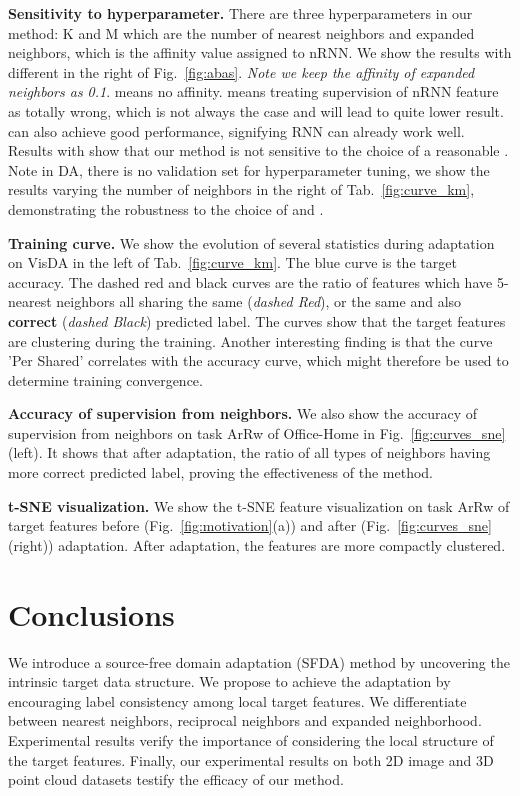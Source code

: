 \documentclass{article}
\begin{document}
\noindent \textbf{Sensitivity to hyperparameter.} There are three hyperparameters in our method: K and M which are the number of nearest neighbors and expanded neighbors,  which is the affinity value assigned to nRNN. We show the results with different  in the right of Fig.~\ref{fig:abas}. \textit{Note we keep the affinity of expanded neighbors as 0.1}.  means no affinity.  means treating supervision of nRNN feature as totally wrong, which is not always the case and will lead to quite lower result.  can also achieve good performance, signifying RNN can already work well. Results with  show that our method is not sensitive to the choice of a reasonable .
{Note in DA, there is no validation set for hyperparameter tuning, we show the results varying the number of neighbors in the right of Tab.~\ref{fig:curve_km}, demonstrating the robustness to the choice of  and .}

\noindent \textbf{Training curve.} We show the evolution of several statistics during adaptation on VisDA in the left of Tab.~\ref{fig:curve_km}. The blue curve is the target accuracy. The dashed red and black curves are the ratio of features which have 5-nearest neighbors all sharing the same (\textit{dashed Red}), or the same and also \textbf{correct} (\textit{dashed Black}) predicted label. The curves show that the target features are clustering during the training. {Another interesting finding is that the curve 'Per Shared' correlates with the accuracy curve, which might therefore be used to determine training convergence.}

\noindent \textbf{Accuracy of supervision from neighbors.} We also show the accuracy of supervision from neighbors on task ArRw of Office-Home
in Fig.~\ref{fig:curves_sne}(left). 
It shows that after adaptation, the ratio of all types of neighbors having more correct predicted label, proving the effectiveness of the method.

\noindent \textbf{t-SNE visualization.} We show the t-SNE feature visualization on task ArRw of target features before (Fig.~\ref{fig:motivation}(a)) and after (Fig.~\ref{fig:curves_sne}(right)) adaptation. After adaptation, the features are more compactly clustered.


\section{Conclusions}


We introduce a source-free domain adaptation (SFDA) method by uncovering the intrinsic target data structure. We propose to achieve the adaptation by encouraging label consistency among local target features. We differentiate between nearest neighbors, reciprocal neighbors and expanded neighborhood. Experimental results verify the importance of considering the local structure of the target features. Finally, our experimental results on both 2D image and 3D point cloud datasets testify the efficacy of our method.
\end{document}
